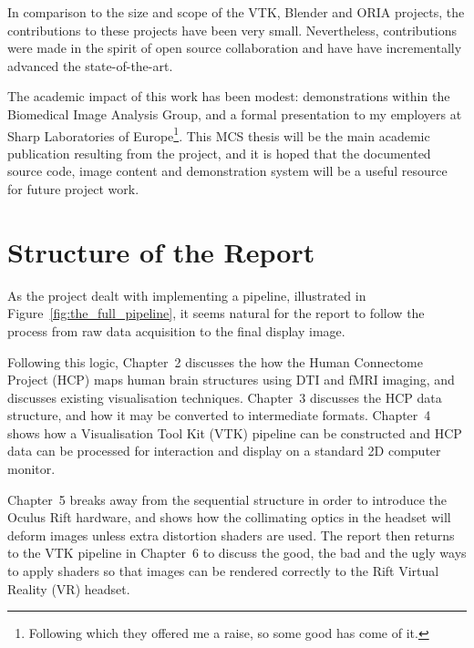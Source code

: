 \documentclass[MSc,paper=a4,pagesize=auto]{icldt}
\begin{document}
In comparison to the size and scope of the VTK, Blender and ORIA projects, the contributions to these projects have been very small. Nevertheless, contributions were made in the spirit of open source collaboration and have have incrementally advanced the state-of-the-art.

The academic impact of this work has been modest: demonstrations within the Biomedical Image Analysis Group, and a formal presentation to my employers at Sharp Laboratories of Europe\footnote{Following which they offered me a raise, so some good has come of it.}. This MCS thesis will be the main academic publication resulting from the project, and it is hoped that the documented source code, image content and demonstration system will be a useful resource for future project work.

\newpage
\section{Structure of the Report} 
\label{sec:structure_of_the_report}
As the project dealt with implementing a pipeline, illustrated in Figure~\ref{fig:the_full_pipeline}, it seems natural for the report to follow the process from raw data acquisition to the final display image. 

Following this logic, Chapter~2 discusses the how the Human Connectome Project (HCP) maps human brain structures using DTI and fMRI imaging, and discusses existing visualisation techniques. Chapter~3 discusses the HCP data structure, and how it may be converted to intermediate formats. Chapter~4 shows how a Visualisation Tool Kit (VTK) pipeline can be constructed and HCP data can be processed for interaction and display on a standard 2D computer monitor. 

Chapter~5 breaks away from the sequential structure in order to introduce the Oculus Rift hardware, and shows how the collimating optics in the headset will deform images unless extra distortion shaders are used. The report then returns to the VTK pipeline in Chapter~6 to discuss the good, the bad and the ugly ways to apply shaders so that images can be rendered correctly to the Rift Virtual Reality (VR) headset. 
\end{document}
